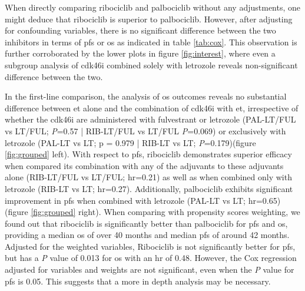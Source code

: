 When directly comparing ribociclib and palbociclib without any adjustments, one might deduce that ribociclib is superior to palbociclib. However, after adjusting for confounding variables, there is no significant difference between the two inhibitors in terms of \ac{pfs} or \ac{os} as indicated in table \ref{tab:cox}. This observation is further corroborated by the lower plots in figure \ref{fig:interest}, where even a subgroup analysis of \ac{cdk46i} combined solely with letrozole reveals non-significant difference between the two.

In the first-line comparison, the analysis of \ac{os} outcomes reveals no substantial difference between \ac{et} alone and the combination of \ac{cdk46i} with \ac{et}, irrespective of whether the \ac{cdk46i} are administered with fulvestrant or letrozole  (PAL-LT/FUL vs LT/FUL; \textit{P}=0.57 | RIB-LT/FUL vs LT/FUL \textit{P}=0.069) or exclusively with letrozole (PAL-LT vs LT; p = 0.979 | RIB-LT vs LT; \textit{P}=0.179)(figure \ref{fig:grouped} left). With respect to \ac{pfs}, ribociclib demonstrates superior efficacy when compared its combination with any of the adjuvants to these adjuvants alone (RIB-LT/FUL vs LT/FUL; \ac{hr}=0.21) as well as when combined only with letrozole (RIB-LT vs LT; \ac{hr}=0.27). Additionally, palbociclib exhibits significant improvement in \ac{pfs} when combined with letrozole  (PAL-LT vs LT; \ac{hr}=0.65) (figure \ref{fig:grouped} right).
When comparing with propensity scores weighting, we found out that ribociclib is significantly better than palbociclib for \ac{pfs} and \ac{os}, providing a median \ac{os} of over 40 months and median \ac{pfs} of around 42 months. Adjusted for the weighted variables, Ribociclib is not significantly better for \ac{pfs}, but has a \textit{P} value of 0.013 for \ac{os} with an \ac{hr} of 0.48. However, the Cox regression adjusted for variables and weights are not significant, even when the \textit{P} value for \ac{pfs} is 0.05. This suggests that a more in depth analysis may be necessary.



